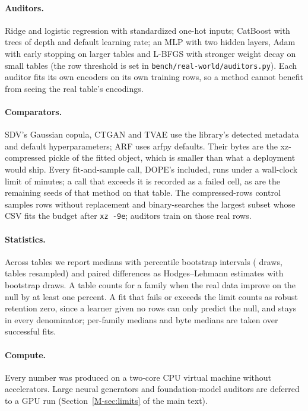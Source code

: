 \documentclass[10pt,letterpaper]{article}
\begin{document}
\paragraph{Auditors.} Ridge and logistic regression with standardized one-hot inputs; CatBoost with
\CfgCatIters{} trees of depth \CfgCatDepth{} and default learning rate; an MLP with two hidden layers,
Adam with early stopping on larger tables and L-BFGS with stronger weight decay on small tables (the row threshold is set in
\texttt{bench/real-world/auditors.py}). Each auditor fits its own encoders on its own training rows, so a method cannot
benefit from seeing the real table's encodings.

\paragraph{Comparators.} SDV's Gaussian copula, CTGAN and TVAE use the library's detected metadata and
default hyperparameters; ARF uses arfpy defaults. Their bytes are the xz-compressed pickle of the fitted
object, which is smaller than what a deployment would ship. Every fit-and-sample call, DOPE's included,
runs under a wall-clock limit of \CfgTimeoutMin{} minutes; a call that exceeds it is recorded as a failed
cell, as are the remaining seeds of that method on that table. The compressed-rows control samples rows
without replacement and binary-searches the largest subset whose CSV fits the budget after
\texttt{xz -9e}; auditors train on those real rows.

\paragraph{Statistics.} Across tables we report medians with percentile bootstrap intervals
(\CfgDraws{} draws, tables resampled) and paired differences as Hodges--Lehmann estimates with
\CfgPairedDraws{} bootstrap draws. A table counts for a family when the real data improve on the null by at
least one percent. A fit that fails or exceeds the limit counts as robust retention zero, since a learner
given no rows can only predict the null, and stays in every denominator; per-family medians and byte
medians are taken over successful fits.

\paragraph{Compute.} Every number was produced on a two-core CPU virtual machine without accelerators.
Large neural generators and foundation-model auditors are deferred to a GPU run (Section~\ref{M-sec:limits} of the main text).
\end{document}
